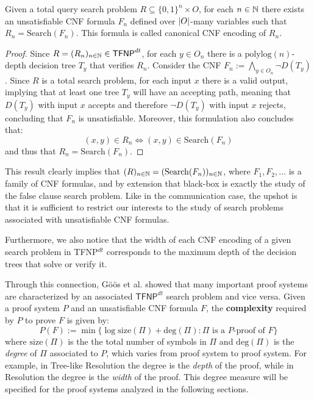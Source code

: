 \begin{proposition}
    \label{Rdt = Search(F)}
 Given a total query search problem $R \subseteq \{0,1\}^n \times O$, for each $n \in \mathbb{N}$ there exists an unsatisfiable CNF formula $F_n$ defined over $\left|O\right|$-many variables such that $R_n = \mathrm{Search}(F_n)$. This formula is called canonical CNF encoding of $R_n$.
\end{proposition}

\begin{proof}
 Since $R = (R_n)_{n \in \mathbb{N}} \in \textsf{TFNP}^{dt}$, for each $y \in O_n$ there is a $\mathrm{polylog}(n)$-depth decision tree $T_y$ that verifies $R_n$. Consider the CNF $F_n := \bigwedge\limits_{y \in O_n} \lnot{D(T_y)}$. Since $R$ is a total search problem, for each input $x$ there is a valid output, implying that at least one tree $T_y$ will have an accepting path, meaning that $D(T_y)$ with input $x$ accepts and therefore $\lnot{D(T_y)}$ with input $x$ rejects, concluding that $F_n$ is unsatisfiable. Moreover, this formulation also concludes that:
    \[(x,y) \in R_n \iff (x,y) \in \mathrm{Search}(F_n)\]
 and thus that $R_n = \mathrm{Search}(F_n)$.

\end{proof}

This result clearly implies that $(R)_{n \in \mathbb{N}} = (\mathrm{Search}(F_n))_{n \in \mathbb{N}}$, where $F_1, F_2, \ldots$ is a family of CNF formulas, and by extension that black-box \TFNP is exactly the study of the false clause search problem. Like in the communication \TFNP case, the upshot is that it is sufficient to restrict our interests to the study of search problems associated with unsatisfiable CNF formulas.

Furthermore, we also notice that the width of each CNF encoding of a given search problem in \textsf{TFNP}$^{dt}$ corresponds to the maximum depth of the decision trees that solve or verify it.

Through this connection, Göös et al. \cite{adventures_monotone_tfnp} showed that many important proof systems are characterized by an associated $\mathsf{TFNP}^{dt}$ search problem and vice versa. Given a proof system $P$ and an unsatisfiable CNF formula $F$, the \textbf{complexity} required by $P$ to prove $F$ is given by:
\[P(F) := \min\{\log \mathrm{size}(\Pi) + \mathrm{deg}(\Pi) : \Pi \text{ is a $P$-proof of } F\}\]
where $\mathrm{size}(\Pi)$ is the the total number of symbols in $\Pi$ and $\mathrm{deg}(\Pi)$ is the \textit{degree} of $\Pi$ associated to $P$, which varies from proof system to proof system. For example, in Tree-like Resolution the degree is the \textit{depth} of the proof, while in Resolution the degree is the \textit{width} of the proof. This degree measure will be specified for the proof systems analyzed in the following sections.


